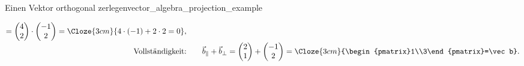 \begin{ExampleBox}{Einen Vektor orthogonal zerlegen}{vector_algebra_projection_example}
\begin{minipage}[c]{0.60\linewidth}
\[\begin{array}{@{}r@{\qquad}l@{}}
            =\begin{pmatrix}4\\2\end{pmatrix}\cdot
            \begin{pmatrix}-1\\2\end{pmatrix}
            =\Cloze{3cm}{4\cdot(-1)+2\cdot2=0}, \\[0.8em]
        \text{Vollständigkeit:}
          &\displaystyle \vec b_{\parallel}+\vec b_{\perp}
            =\begin{pmatrix}2\\1\end{pmatrix}
            +\begin{pmatrix}-1\\2\end{pmatrix}
            =\Cloze{3cm}{\begin{pmatrix}1\\3\end{pmatrix}=\vec b}.
      \end{array}
    \]
  \end{minipage}\hfill
  \begin{minipage}[c]{0.38\linewidth}
    \centering
  \end{minipage}
\end{ExampleBox}

